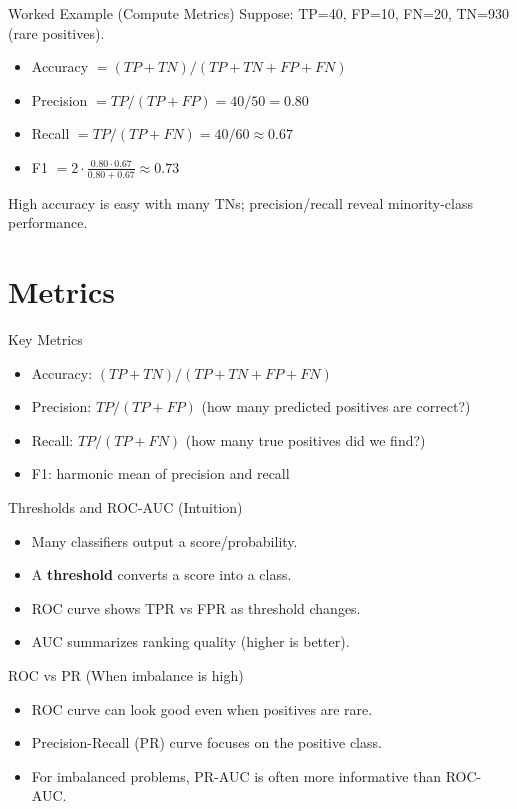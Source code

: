 \documentclass[aspectratio=169]{beamer}
\begin{document}
\begin{frame}{Worked Example (Compute Metrics)}
  Suppose: TP=40,\; FP=10,\; FN=20,\; TN=930 (rare positives).
  \begin{itemize}[<+->]
    \item Accuracy $= (TP+TN)/(TP+TN+FP+FN)$
    \item Precision $= TP/(TP+FP)=40/50=0.80$
    \item Recall $= TP/(TP+FN)=40/60\approx 0.67$
    \item F1 $= 2\cdot \frac{0.80\cdot 0.67}{0.80+0.67}\approx 0.73$
  \end{itemize}
  \vspace{0.3em}
  \small High accuracy is easy with many TNs; precision/recall reveal minority-class performance.
\end{frame}

\section{Metrics}
\label{sec:metrics}

\begin{frame}{Key Metrics}
  \begin{itemize}[<+->]
    \item Accuracy: $(TP+TN)/(TP+TN+FP+FN)$
    \item Precision: $TP/(TP+FP)$ (how many predicted positives are correct?)
    \item Recall: $TP/(TP+FN)$ (how many true positives did we find?)
    \item F1: harmonic mean of precision and recall
  \end{itemize}
\end{frame}

\begin{frame}{Thresholds and ROC-AUC (Intuition)}
  \begin{itemize}[<+->]
    \item Many classifiers output a score/probability.
    \item A \textbf{threshold} converts a score into a class.
    \item ROC curve shows TPR vs FPR as threshold changes.
    \item AUC summarizes ranking quality (higher is better).
  \end{itemize}
\end{frame}

\begin{frame}{ROC vs PR (When imbalance is high)}
  \begin{itemize}[<+->]
    \item ROC curve can look good even when positives are rare.
    \item Precision-Recall (PR) curve focuses on the positive class.
    \item For imbalanced problems, PR-AUC is often more informative than ROC-AUC.
  \end{itemize}
\end{frame}
\end{document}
